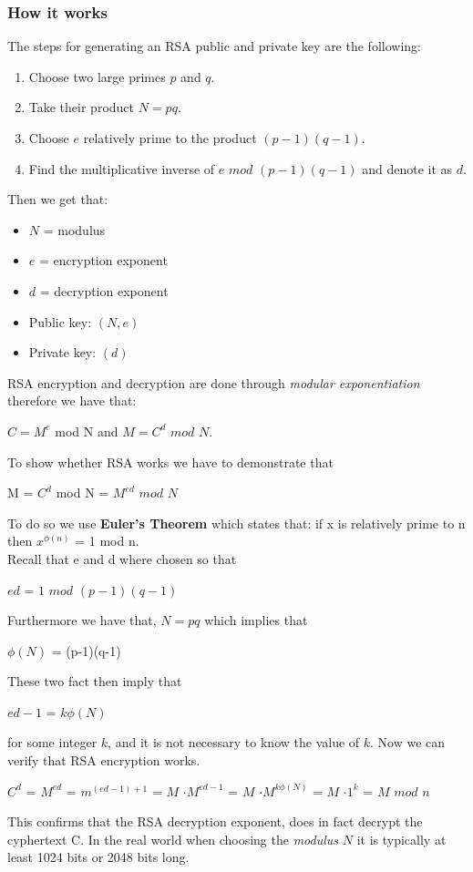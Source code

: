 \documentclass{article}
\begin{document}
\subsubsection{How it works}
The steps for generating an RSA public and private key are the following:
\begin{enumerate}
    \item Choose two large primes $p$ and $q$.
    \item Take their product $N = pq$.
    \item Choose $e$ relatively prime to the product $(p-1)(q-1)$.
    \item Find the multiplicative inverse of $e$ $mod$ $(p-1)(q-1)$ and denote it as $d$.
\end{enumerate}
Then we get that:
\begin{itemize}
    \item $N$ = modulus
    \item $e$ = encryption exponent
    \item $d$ = decryption exponent
    \item Public key: $(N,e)$
    \item Private key: $(d)$
\end{itemize}
RSA encryption and decryption are done through \textit{modular exponentiation} therefore we have that:
\begin{center}
$C = M^e$ mod N and $M = C^d$ $mod$ $N$.
\end{center}{}
To show whether RSA works we have to demonstrate that
\begin{center}
    M = $C^d$ mod N = $M^{ed}$ $mod$ $N$
\end{center}{}
To do so we use \textbf{Euler's Theorem} which states that: if x is relatively prime to n then $x^{\phi(n)}$ = 1 mod n.\\
Recall that e and d where chosen so that 
\begin{center}
$ed$ = $1$ $mod$ $(p-1)(q-1)$
\end{center}
Furthermore we have that, $N = pq$ which implies that
\begin{center}
    $\phi(N)$ = (p-1)(q-1)
\end{center}
These two fact then imply that
\begin{center}
    $ed - 1$ = $k\phi(N)$
\end{center}
for some integer $k$, and it is not necessary to know the value of $k$. Now we can verify that RSA encryption works.
\begin{center}
    $C^d$ = $M^{ed}$ = $m^{(ed-1) + 1}$ = $M$ $\cdot M^{ed-1}$ = $M$ $\cdot M^{k\phi(N)}$ = $M$ $\cdot 1^k$ = $M$ $mod$ $n$
\end{center}
This confirms that the RSA decryption exponent, does in fact decrypt the cyphertext C.
In the real world when choosing the \textit{modulus} $N$ it is typically at least 1024 bits or 2048 bits long.
\end{document}
